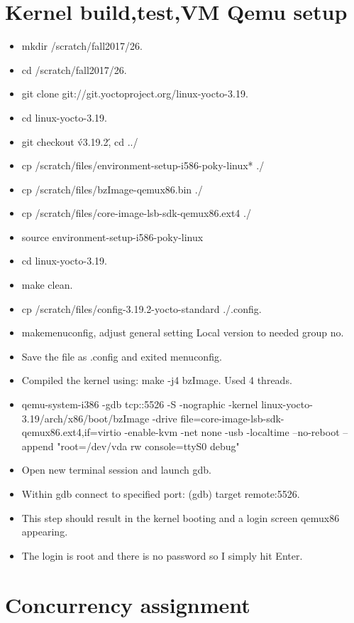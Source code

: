 \documentclass[letterpaper,10pt,fleqn]{article}
\begin{document}
	\section*{Kernel build,test,VM Qemu setup}

	\begin{itemize}
		\item mkdir /scratch/fall2017/26.
		\item cd /scratch/fall2017/26.
		\item git clone git://git.yoctoproject.org/linux-yocto-3.19.
		\item cd linux-yocto-3.19.
		\item git checkout \'v3.19.2\', cd ../
		\item cp /scratch/files/environment-setup-i586-poky-linux* ./
		\item cp /scratch/files/bzImage-qemux86.bin ./
		\item cp /scratch/files/core-image-lsb-sdk-qemux86.ext4 ./
		\item source environment-setup-i586-poky-linux
		\item cd linux-yocto-3.19.
		\item make clean.
		\item cp /scratch/files/config-3.19.2-yocto-standard ./.config.
		\item makemenuconfig, adjust general setting Local version to needed group no.
		\item Save the file as .config and exited menuconfig.
		\item Compiled the kernel using: make -j4 bzImage. Used 4 threads.
		\item qemu-system-i386 -gdb tcp::5526 -S -nographic -kernel linux-yocto-3.19/arch/x86/boot/bzImage -drive file=core-image-lsb-sdk-qemux86.ext4,if=virtio -enable-kvm -net none -usb -localtime --no-reboot --append "root=/dev/vda rw console=ttyS0 debug"
		\item Open new terminal session and launch gdb.
		\item Within gdb connect to specified port: (gdb) target remote:5526.
		\item This step should result in the kernel booting and a login screen qemux86 appearing.
		\item The login is root and there is no password so I simply hit Enter.

	\end{itemize}


	\section*{Concurrency assignment}
\end{document}
